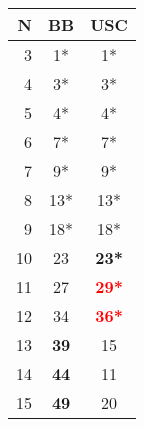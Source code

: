 \begin{table}[t]\scriptsize
\begin{tabular}{r|c|c}
 \hline
 N&BB &USC\\
 \hline
 3&1*&1*\\
 4&3*&3*\\
 5&4*&4*\\
 6&7*&7*\\
 7&9*&9*\\
 8&13*&13*\\
 9&18*&18*\\
 10&23&\textbf{23*}\\
 11&27&\textbf{\textcolor{red}{29*}}\\
 12&34&\textbf{\textcolor{red}{36*}}\\
 13&\textbf{39}&15\\
 14&\textbf{44}&11\\
 15&\textbf{49}&20\\
\end{tabular}
\end{table}
